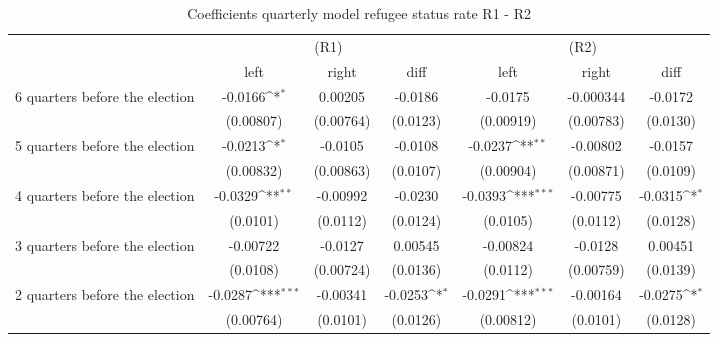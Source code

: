 \begin{table}[!ht]\centering \footnotesize
\def\sym#1{\ifmmode^{#1}\else\(^{#1}\)\fi}
\caption{Coefficients quarterly model refugee status rate R1 - R2}
\begin{tabular}{l*{6}{c}}
\hline\hline
                    &\multicolumn{3}{c}{(R1)}&\multicolumn{3}{c}{(R2)}\\
&\multicolumn{1}{c}{left}&\multicolumn{1}{c}{right}&\multicolumn{1}{c}{diff}&\multicolumn{1}{c}{left}&\multicolumn{1}{c}{right}&\multicolumn{1}{c}{diff}\\
\hline
 6 quarters before the election&     -0.0166\sym{*}  &     0.00205         &     -0.0186         &     -0.0175         &   -0.000344         &     -0.0172         \\
                    &   (0.00807)         &   (0.00764)         &    (0.0123)         &   (0.00919)         &   (0.00783)         &    (0.0130)         \\
[0,5em]
 5 quarters before the election&     -0.0213\sym{*}  &     -0.0105         &     -0.0108         &     -0.0237\sym{**} &    -0.00802         &     -0.0157         \\
                    &   (0.00832)         &   (0.00863)         &    (0.0107)         &   (0.00904)         &   (0.00871)         &    (0.0109)         \\
[0,5em]
 4 quarters before the election&     -0.0329\sym{**} &    -0.00992         &     -0.0230         &     -0.0393\sym{***}&    -0.00775         &     -0.0315\sym{*}  \\
                    &    (0.0101)         &    (0.0112)         &    (0.0124)         &    (0.0105)         &    (0.0112)         &    (0.0128)         \\
[0,5em]
 3 quarters before the election&    -0.00722         &     -0.0127         &     0.00545         &    -0.00824         &     -0.0128         &     0.00451         \\
                    &    (0.0108)         &   (0.00724)         &    (0.0136)         &    (0.0112)         &   (0.00759)         &    (0.0139)         \\
[0,5em]
 2 quarters before the election&     -0.0287\sym{***}&    -0.00341         &     -0.0253\sym{*}  &     -0.0291\sym{***}&    -0.00164         &     -0.0275\sym{*}  \\
                    &   (0.00764)         &    (0.0101)         &    (0.0126)         &   (0.00812)         &    (0.0101)         &    (0.0128)         \\

\end{tabular}
\end{table}
